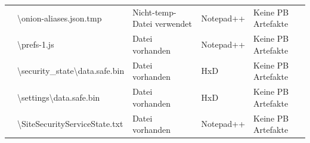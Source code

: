 \begin{appendices}
{\begin{landscape}
\begin{table}[h!]
{\begin{tabular}{cllll}
	\multicolumn{1}{|c|}{}                                                                                        & \multicolumn{1}{l|}{\cellcolor[HTML]{3190FF}\textbackslash{}onion-aliases.json.tmp}                                                            & \multicolumn{1}{l|}{\cellcolor[HTML]{FCFF2F}Nicht-temp-Datei verwendet} & \multicolumn{1}{l|}{\cellcolor[HTML]{FFFFFF}Notepad++}            & \multicolumn{1}{l|}{\cellcolor[HTML]{F8A102}Keine PB Artefakte} \\ \cline{2-5} 
	\multicolumn{1}{|c|}{}                                                                                        & \multicolumn{1}{l|}{\cellcolor[HTML]{3190FF}\textbackslash{}prefs-1.js}                                                                        & \multicolumn{1}{l|}{\cellcolor[HTML]{009901}Datei vorhanden}            & \multicolumn{1}{l|}{\cellcolor[HTML]{FFFFFF}Notepad++}            & \multicolumn{1}{l|}{\cellcolor[HTML]{F8A102}Keine PB Artefakte} \\ \cline{2-5} 
	\multicolumn{1}{|c|}{}                                                                                        & \multicolumn{1}{l|}{\cellcolor[HTML]{3190FF}\textbackslash{}security\_state\textbackslash{}data.safe.bin}                                      & \multicolumn{1}{l|}{\cellcolor[HTML]{009901}Datei vorhanden}            & \multicolumn{1}{l|}{\cellcolor[HTML]{FFFFFF}HxD}                  & \multicolumn{1}{l|}{\cellcolor[HTML]{F8A102}Keine PB Artefakte} \\ \cline{2-5} 
	\multicolumn{1}{|c|}{}                                                                                        & \multicolumn{1}{l|}{\cellcolor[HTML]{3190FF}\textbackslash{}settings\textbackslash{}data.safe.bin}                                             & \multicolumn{1}{l|}{\cellcolor[HTML]{009901}Datei vorhanden}            & \multicolumn{1}{l|}{\cellcolor[HTML]{FFFFFF}HxD}                  & \multicolumn{1}{l|}{\cellcolor[HTML]{F8A102}Keine PB Artefakte} \\ \cline{2-5} 
	\multicolumn{1}{|c|}{}                                                                                        & \multicolumn{1}{l|}{\cellcolor[HTML]{3190FF}\textbackslash{}SiteSecurityServiceState.txt}                                                      & \multicolumn{1}{l|}{\cellcolor[HTML]{009901}Datei vorhanden}            & \multicolumn{1}{l|}{\cellcolor[HTML]{FFFFFF}Notepad++}            & \multicolumn{1}{l|}{\cellcolor[HTML]{F8A102}Keine PB Artefakte} \\ \cline{2-5} 

\end{tabular}}
\end{table}
\end{landscape}}
\end{appendices}
